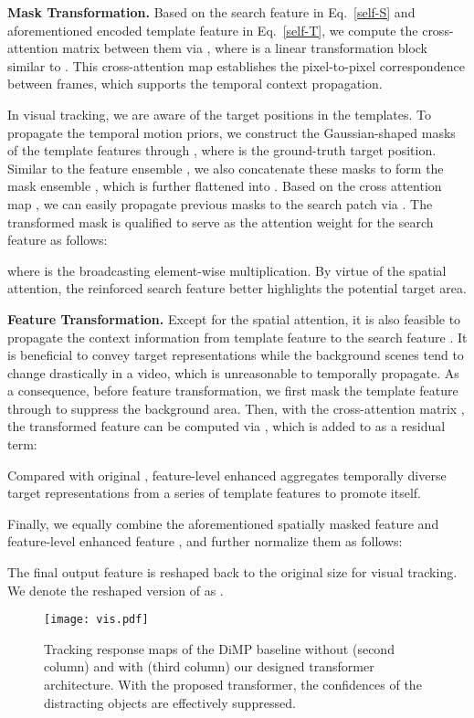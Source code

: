 \documentclass[10pt,twocolumn,letterpaper]{article}
\begin{document}
{\flushleft \bf Mask Transformation.}
Based on the search feature  in Eq.~\ref{self-S} and aforementioned encoded template feature  in Eq.~\ref{self-T}, we compute the cross-attention matrix between them via , where  is a  linear transformation block similar to .
This cross-attention map  establishes the pixel-to-pixel correspondence between frames, which supports the temporal context propagation.



In visual tracking, we are aware of the target positions in the templates.
To propagate the temporal motion priors, we construct the Gaussian-shaped masks of the template features through , where  is the ground-truth target position.
Similar to the feature ensemble , we also concatenate these masks  to form the mask ensemble , which is further flattened into .
Based on the cross attention map , we can easily propagate previous masks to the search patch via . 
The transformed mask is qualified to serve as the attention weight for the search feature  as follows:

where  is the broadcasting element-wise multiplication. By virtue of the spatial attention, the reinforced search feature  better highlights the potential target area.



{\flushleft \bf Feature Transformation.} 
Except for the spatial attention, it is also feasible to propagate the context information from template feature  to the search feature . 
It is beneficial to convey target representations while the background scenes tend to change drastically in a video, which is unreasonable to temporally propagate.
As a consequence, before feature transformation, we first mask the template feature through  to suppress the background area.
Then, with the cross-attention matrix , the transformed feature can be computed via , which is added to  as a residual term:

Compared with original , feature-level enhanced  aggregates temporally diverse target representations from a series of template features  to promote itself.


Finally, we equally combine the aforementioned spatially masked feature  and feature-level enhanced feature , and further normalize them as follows:

The final output feature  is reshaped back to the original size for visual tracking. 
We denote the reshaped version of  as .




\begin{figure}
	\centering
	\texttt{[image: vis.pdf]}
	\caption{Tracking response maps of the DiMP baseline \cite{DiMP} without (second column) and with (third column) our designed transformer architecture. With the proposed transformer, the confidences of the distracting objects are effectively suppressed.}\label{fig:vis}
	\vspace{-0.1in}
\end{figure}
\end{document}
